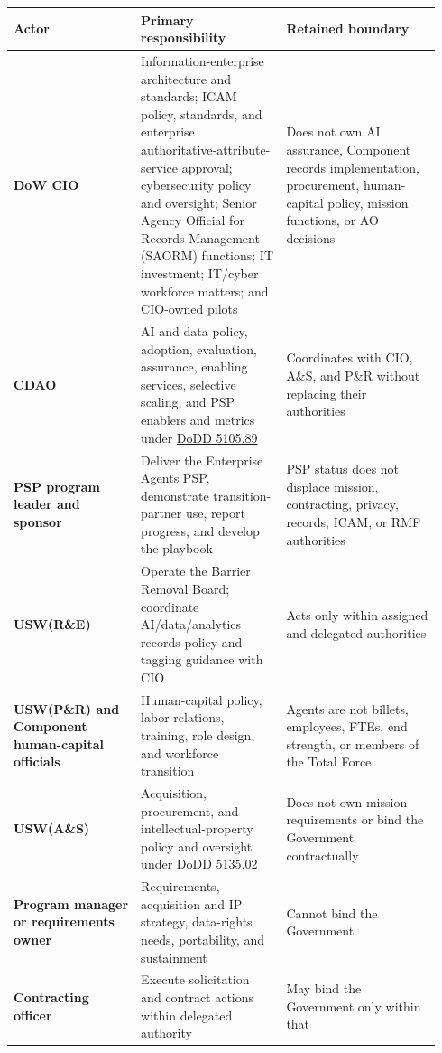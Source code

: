 \documentclass[11pt]{article}
\begin{document}
\begingroup\footnotesize\setlength{\tabcolsep}{3pt}\begin{longtable}{p{0.28\linewidth}p{0.32\linewidth}p{0.34\linewidth}}
\toprule\noalign{}
Actor & Primary responsibility & Retained boundary \\
\midrule\noalign{}
\endhead
\bottomrule\noalign{}
\endlastfoot
\textbf{DoW CIO} & Information-enterprise architecture and standards;
ICAM policy, standards, and enterprise authoritative-attribute-service
approval; cybersecurity policy and oversight; Senior Agency Official for
Records Management (SAORM) functions; IT investment; IT/cyber workforce
matters; and CIO-owned pilots & Does not own AI assurance, Component
records implementation, procurement, human-capital policy, mission
functions, or AO decisions \\
\textbf{CDAO} & AI and data policy, adoption, evaluation, assurance,
enabling services, selective scaling, and PSP enablers and metrics under
\href{https://www.esd.whs.mil/Portals/54/Documents/DD/issuances/dodd/510589p.PDF}{DoDD
5105.89} & Coordinates with CIO, A\&S, and P\&R without replacing their
authorities \\
\textbf{PSP program leader and sponsor} & Deliver the Enterprise Agents
PSP, demonstrate transition-partner use, report progress, and develop
the playbook & PSP status does not displace mission, contracting,
privacy, records, ICAM, or RMF authorities \\
\textbf{USW(R\&E)} & Operate the Barrier Removal Board; coordinate
AI/data/analytics records policy and tagging guidance with CIO & Acts
only within assigned and delegated authorities \\
\textbf{USW(P\&R) and Component human-capital officials} & Human-capital
policy, labor relations, training, role design, and workforce transition
& Agents are not billets, employees, FTEs, end strength, or members of
the Total Force \\
\textbf{USW(A\&S)} & Acquisition, procurement, and intellectual-property
policy and oversight under
\href{https://www.esd.whs.mil/Portals/54/Documents/DD/issuances/dodd/513502p.pdf}{DoDD
5135.02} & Does not own mission requirements or bind the Government
contractually \\
\textbf{Program manager or requirements owner} & Requirements,
acquisition and IP strategy, data-rights needs, portability, and
sustainment & Cannot bind the Government \\
\textbf{Contracting officer} & Execute solicitation and contract actions
within delegated authority & May bind the Government only within that

\end{longtable}
\end{document}
